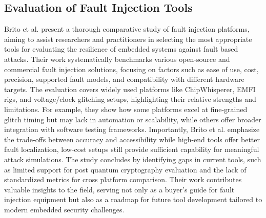 \subsection*{Evaluation of Fault Injection Tools \cite{brito2023evaluation}}
Brito et al. present a thorough comparative study of fault injection platforms, aiming to assist researchers and practitioners in selecting the most appropriate tools for evaluating the resilience of embedded systems against fault based attacks. Their work systematically benchmarks various open-source and commercial fault injection solutions, focusing on factors such as ease of use, cost, precision, supported fault models, and compatibility with different hardware targets. The evaluation covers widely used platforms like ChipWhisperer, EMFI rigs, and voltage/clock glitching setups, highlighting their relative strengths and limitations. For example, they show how some platforms excel at fine-grained glitch timing but may lack in automation or scalability, while others offer broader integration with software testing frameworks. Importantly, Brito et al. emphasize the trade-offs between accuracy and accessibility while high-end tools offer better fault localization, low-cost setups still provide sufficient capability for meaningful attack simulations. The study concludes by identifying gaps in current tools, such as limited support for post quantum cryptography evaluation and the lack of standardized metrics for cross platform comparison. Their work contributes valuable insights to the field, serving not only as a buyer's guide for fault injection equipment but also as a roadmap for future tool development tailored to modern embedded security challenges.

